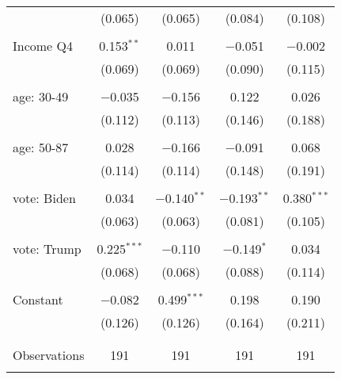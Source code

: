\begin{tabular}{@{\extracolsep{5pt}}lcccc}
  & (0.065) & (0.065) & (0.084) & (0.108) \\ 
  & & & & \\ 
 Income Q4 & 0.153$^{**}$ & 0.011 & $-$0.051 & $-$0.002 \\ 
  & (0.069) & (0.069) & (0.090) & (0.115) \\ 
  & & & & \\ 
 age: 30-49 & $-$0.035 & $-$0.156 & 0.122 & 0.026 \\ 
  & (0.112) & (0.113) & (0.146) & (0.188) \\ 
  & & & & \\ 
 age: 50-87 & 0.028 & $-$0.166 & $-$0.091 & 0.068 \\ 
  & (0.114) & (0.114) & (0.148) & (0.191) \\ 
  & & & & \\ 
 vote: Biden & 0.034 & $-$0.140$^{**}$ & $-$0.193$^{**}$ & 0.380$^{***}$ \\ 
  & (0.063) & (0.063) & (0.081) & (0.105) \\ 
  & & & & \\ 
 vote: Trump & 0.225$^{***}$ & $-$0.110 & $-$0.149$^{*}$ & 0.034 \\ 
  & (0.068) & (0.068) & (0.088) & (0.114) \\ 
  & & & & \\ 
 Constant & $-$0.082 & 0.499$^{***}$ & 0.198 & 0.190 \\ 
  & (0.126) & (0.126) & (0.164) & (0.211) \\ 
  & & & & \\ 
\hline \\[-1.8ex] 

Observations & 191 & 191 & 191 & 191 \\ 
\hline 
\hline \\[-1.8ex] 
\end{tabular} 